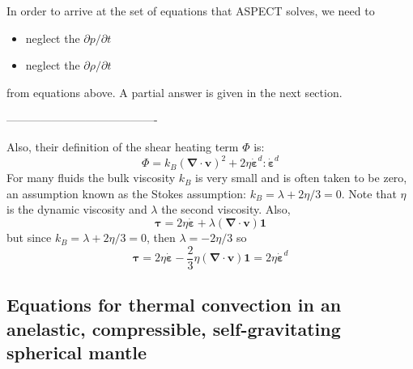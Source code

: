 In order to arrive at the set of equations that ASPECT solves, 
we need to 
\begin{itemize}
\item neglect the $\partial p/\partial t$
\item neglect the $\partial \rho / \partial t$ 
\end{itemize}
from equations above. A partial answer is given in the next section. 

----------------------------------------

Also, their definition of the shear heating term $\Phi$ is:
\[
\Phi = k_B ({\bm \nabla}\cdot{\bm v})^2 + 2\eta \dot{\bm \varepsilon}^d:\dot{\bm \varepsilon}^d
\]
For many fluids the bulk viscosity $k_B$ is very small and is often taken to be zero, an assumption known
as the Stokes assumption: $k_B=\lambda+2\eta/3=0$. 
Note that $\eta$ is the dynamic viscosity and $\lambda$ the second viscosity. 
Also, 
\[
{\bm \tau}=2\eta \dot{\bm \varepsilon} + \lambda ({\bm \nabla}\cdot{\bm v}) {\bm 1}
\]
but since $k_B=\lambda+2\eta/3=0$, then $\lambda=-2\eta/3$ so 
\[
{\bm \tau}=2\eta \dot{\bm \varepsilon} -\frac{2}{3}\eta ({\bm \nabla}\cdot{\bm v}) {\bm 1} = 2\eta \dot{\bm \varepsilon}^d
\]

\subsection{Equations for thermal convection in an anelastic, compressible, self-gravitating spherical mantle }

